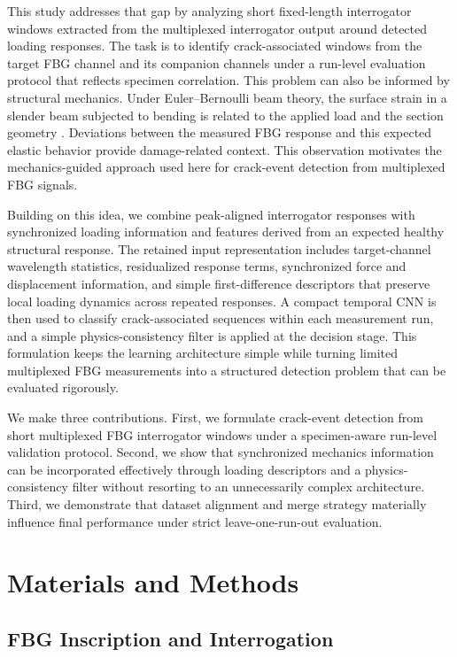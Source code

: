 \documentclass[notspecified,article,submit,pdftex,moreauthors]{Definitions/mdpi}
\begin{document}
This study addresses that gap by analyzing short fixed-length interrogator windows extracted from the multiplexed interrogator output around detected loading responses. The task is to identify crack-associated windows from the target FBG channel and its companion channels under a run-level evaluation protocol that reflects specimen correlation. This problem can also be informed by structural mechanics. Under Euler--Bernoulli beam theory, the surface strain in a slender beam subjected to bending is related to the applied load and the section geometry \cite{ochsner2021}. Deviations between the measured FBG response and this expected elastic behavior provide damage-related context. This observation motivates the mechanics-guided approach used here for crack-event detection from multiplexed FBG signals.

Building on this idea, we combine peak-aligned interrogator responses with synchronized loading information and features derived from an expected healthy structural response. The retained input representation includes target-channel wavelength statistics, residualized response terms, synchronized force and displacement information, and simple first-difference descriptors that preserve local loading dynamics across repeated responses. A compact temporal CNN is then used to classify crack-associated sequences within each measurement run, and a simple physics-consistency filter is applied at the decision stage. This formulation keeps the learning architecture simple while turning limited multiplexed FBG measurements into a structured detection problem that can be evaluated rigorously.

We make three contributions. First, we formulate crack-event detection from short multiplexed FBG interrogator windows under a specimen-aware run-level validation protocol. Second, we show that synchronized mechanics information can be incorporated effectively through loading descriptors and a physics-consistency filter without resorting to an unnecessarily complex architecture. Third, we demonstrate that dataset alignment and merge strategy materially influence final performance under strict leave-one-run-out evaluation.

\section{Materials and Methods}

\subsection{FBG Inscription and Interrogation}
\end{document}
